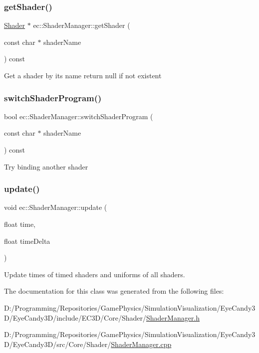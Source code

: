 \subsubsection{\texorpdfstring{get\+Shader()}{getShader()}}
{\footnotesize\ttfamily \mbox{\hyperlink{classec_1_1_shader}{Shader}} $\ast$ ec\+::\+Shader\+Manager\+::get\+Shader (\begin{DoxyParamCaption}\item[{const char $\ast$}]{shader\+Name }\end{DoxyParamCaption}) const}

Get a shader by its name return null if not existent \mbox{\label{classec_1_1_shader_manager_af42171dd2256a130b056d772e3190da0}} 
\subsubsection{\texorpdfstring{switch\+Shader\+Program()}{switchShaderProgram()}}
{\footnotesize\ttfamily bool ec\+::\+Shader\+Manager\+::switch\+Shader\+Program (\begin{DoxyParamCaption}\item[{const char $\ast$}]{shader\+Name }\end{DoxyParamCaption}) const}

Try binding another shader \mbox{\label{classec_1_1_shader_manager_ac5dc847819a1e8d154d8fd0280e488c1}} 
\subsubsection{\texorpdfstring{update()}{update()}}
{\footnotesize\ttfamily void ec\+::\+Shader\+Manager\+::update (\begin{DoxyParamCaption}\item[{float}]{time,  }\item[{float}]{time\+Delta }\end{DoxyParamCaption})}

Update times of timed shaders and uniforms of all shaders. 

The documentation for this class was generated from the following files\+:\begin{DoxyCompactItemize}
\item 
D\+:/\+Programming/\+Repositories/\+Game\+Physics/\+Simulation\+Visualization/\+Eye\+Candy3\+D/\+Eye\+Candy3\+D/include/\+E\+C3\+D/\+Core/\+Shader/\mbox{\hyperlink{_shader_manager_8h}{Shader\+Manager.\+h}}\item 
D\+:/\+Programming/\+Repositories/\+Game\+Physics/\+Simulation\+Visualization/\+Eye\+Candy3\+D/\+Eye\+Candy3\+D/src/\+Core/\+Shader/\mbox{\hyperlink{_shader_manager_8cpp}{Shader\+Manager.\+cpp}}\end{DoxyCompactItemize}

